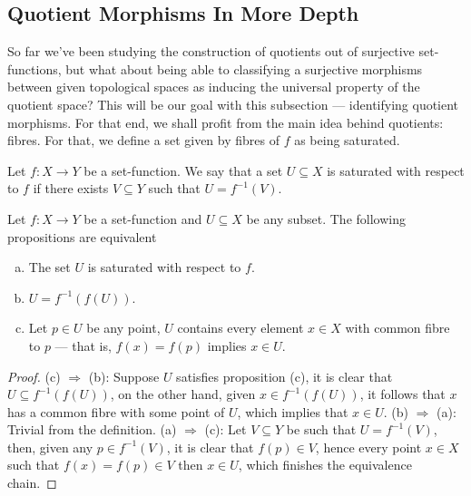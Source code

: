\subsection{Quotient Morphisms In More Depth}

So far we've been studying the construction of quotients out of surjective
set-functions, but what about being able to classifying a surjective morphisms
between given topological spaces as inducing the universal property of the
quotient space? This will be our goal with this subsection --- identifying
quotient morphisms. For that end, we shall profit from the main idea behind
quotients: fibres. For that, we define a set given by fibres of \(f\) as being
saturated.

\begin{definition}
    \label{def:saturated-fibre}
    Let \(f: X \to Y\) be a set-function. We say that a set \(U \subseteq X\) is
    saturated with respect to \(f\) if there exists \(V \subseteq Y\) such that
    \(U = f^{-1}(V)\).
\end{definition}

\begin{proposition}
    \label{prop:equivalences-saturated-fibre}
    Let \(f: X \to Y\) be a set-function and \(U \subseteq X\) be any subset. The
    following propositions are equivalent
    \begin{enumerate}[(a)]\setlength\itemsep{0em}
        \item The set \(U\) is saturated with respect to \(f\).
        \item \(U = f^{-1}(f(U))\).
        \item Let \(p \in U\) be any point, \(U\) contains every element \(x \in X\)
              with common fibre to \(p\) --- that is, \(f(x) = f(p)\) implies \(x \in U\).
    \end{enumerate}
\end{proposition}

\begin{proof}
    (c) \(\Rightarrow\) (b): Suppose \(U\) satisfies proposition (c), it is clear
    that \(U \subseteq f^{-1}(f(U))\), on the other hand, given \(x \in
    f^{-1}(f(U))\), it follows that \(x\) has a common fibre with some point of
    \(U\), which implies that \(x \in U\). (b) \(\Rightarrow\) (a): Trivial from the
    definition. (a) \(\Rightarrow\) (c): Let \(V \subseteq Y\) be such that \(U =
    f^{-1}(V)\), then, given any \(p \in f^{-1}(V)\), it is clear that \(f(p) \in
    V\), hence every point \(x \in X\) such that \(f(x) = f(p) \in V\) then \(x \in
    U\), which finishes the equivalence chain.
\end{proof}

